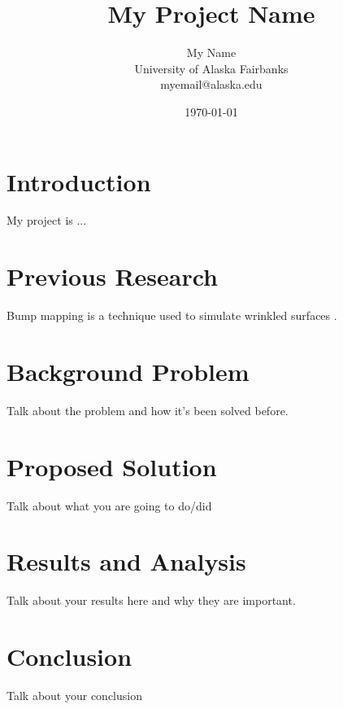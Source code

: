 \documentclass{IEEEtran}
\begin{document}
\title{My Project Name}
\author{My Name\\University of Alaska Fairbanks\\myemail@alaska.edu}
\date{\today}
\maketitle

\section{Introduction}

My project is ...

\section{Previous Research}

Bump mapping is a technique used to simulate wrinkled surfaces \cite{blinn1978simulation}.

\section{Background Problem}

Talk about the problem and how it's been solved before.

\section{Proposed Solution}

Talk about what you are going to do/did

\section{Results and Analysis}

Talk about your results here and why they are important.

\section{Conclusion}

Talk about your conclusion



\end{document}
